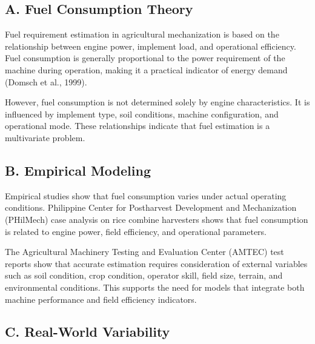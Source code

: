 \documentclass[11pt,twocolumn]{article}
\begin{document}
\vspace{10pt}

\subsection*{A. Fuel Consumption Theory}

\vspace{10pt}

Fuel requirement estimation in agricultural mechanization is based on the relationship between engine power, implement load, and operational efficiency. Fuel consumption is generally proportional to the power requirement of the machine during operation, making it a practical indicator of energy demand (Domsch et al., 1999).

\vspace{10pt}

However, fuel consumption is not determined solely by engine characteristics. It is influenced by implement type, soil conditions, machine configuration, and operational mode. These relationships indicate that fuel estimation is a multivariate problem.

\subsection*{B. Empirical Modeling}

\vspace{10pt}

Empirical studies show that fuel consumption varies under actual operating conditions. Philippine Center for Postharvest Development and Mechanization (PHilMech) case analysis on rice combine harvesters shows that fuel consumption is related to engine power, field efficiency, and operational parameters.

\vspace{10pt}

The Agricultural Machinery Testing and Evaluation Center (AMTEC) test reports show that accurate estimation requires consideration of external variables such as soil condition, crop condition, operator skill, field size, terrain, and environmental conditions. This supports the need for models that integrate both machine performance and field efficiency indicators.

\subsection*{C. Real-World Variability}
\end{document}
